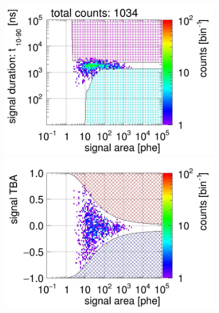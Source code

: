 \begin{landscape}
\begin{figure}[!p]
\begin{subfigure}[t]{0.33\textwidth}
			\caption{}
			\label{fig:signal selection dv 12 03}
		\end{subfigure}
		\begin{subfigure}[t]{0.33\textwidth}
			\centering
			\includegraphics[width=\figurewidth,clip,trim={0 98 0 0}]{Figures/GasTest/CutsValid/res64767/pdpa29Vecfig64767.jpg}
			\includegraphics[width=\figurewidth,clip,trim={0 98 0 40}]{Figures/GasTest/CutsValid/res64767/tbapa29Vecfig64767.jpg}

\end{subfigure}
\end{figure}
\end{landscape}
